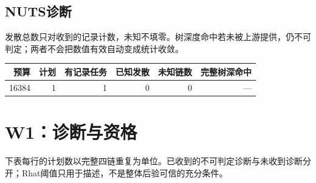 \documentclass[UTF8,fontset=fandol,a4paper]{ctexart}
\begin{document}
\subsection*{NUTS诊断}
发散总数只对收到的记录计数，未知不填零。树深度命中若未被上游提供，仍不可判定；两者不会把数值有效自动变成统计收敛。
\begin{longtable}{rrrrrr}
\toprule 预算 & 计划 & 有记录任务 & 已知发散 & 未知链数 & 完整树深命中 \\ \midrule\endhead
16384 & 1 & 1 & 0 & 0 & — \\
\bottomrule\end{longtable}
\clearpage\section*{W1：诊断与资格}
下表每行的计划数以完整四链重复为单位。已收到的不可判定诊断与未收到诊断分开；Rhat阈值只用于描述，不是整体后验可信的充分条件。
\end{document}
